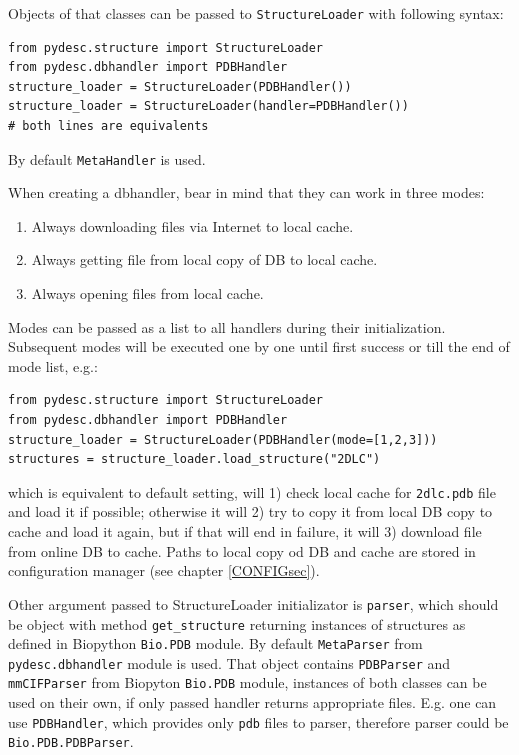 \documentclass{article}
\begin{document}
Objects of that classes can be passed to \texttt{StructureLoader} with following syntax:

\begin{lstlisting}
from pydesc.structure import StructureLoader
from pydesc.dbhandler import PDBHandler
structure_loader = StructureLoader(PDBHandler())
structure_loader = StructureLoader(handler=PDBHandler())
# both lines are equivalents
\end{lstlisting}

    By default \texttt{MetaHandler} is used.
    
    When creating a dbhandler, bear in mind that they can work in three modes:
    \begin{enumerate}
        \item Always downloading files via Internet to local cache.
        \item Always getting file from local copy of DB to local cache.
        \item Always opening files from local cache.
    \end{enumerate}

    Modes can be passed as a list to all handlers during their initialization. Subsequent modes will be executed one by one until first success or till the end of mode list, e.g.:

\begin{lstlisting}
from pydesc.structure import StructureLoader
from pydesc.dbhandler import PDBHandler
structure_loader = StructureLoader(PDBHandler(mode=[1,2,3]))
structures = structure_loader.load_structure("2DLC")
\end{lstlisting}
    
    which is equivalent to default setting, will 1) check local cache for \texttt{2dlc.pdb} file and load it if possible; otherwise it will 2) try to copy it from local DB copy to cache and load it again, but if that will end in failure, it will 3) download file from online DB to cache. Paths to local copy od DB and cache are stored in configuration manager (see chapter \ref{CONFIGsec}).

    Other argument passed to StructureLoader initializator is \texttt{parser}, which should be object with method \texttt{get\_{}structure} returning instances of structures as defined in Biopython \texttt{Bio.PDB} module. By default \texttt{MetaParser} from \texttt{pydesc.dbhandler} module is used. That object contains \texttt{PDBParser} and \texttt{mmCIFParser} from Biopyton \texttt{Bio.PDB} module, instances of both classes can be used on their own, if only passed handler returns appropriate files. E.g. one can use \texttt{PDBHandler}, which provides only \texttt{pdb} files to parser, therefore parser could be \texttt{Bio.PDB.PDBParser}.
\end{document}
